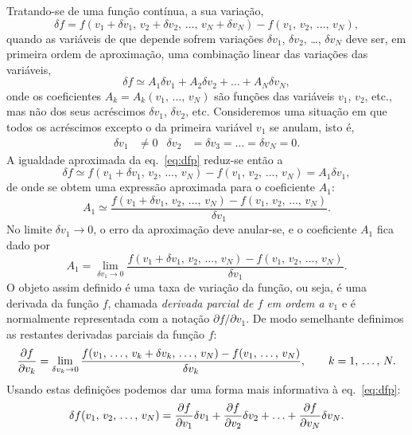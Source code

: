 Tratando-se de uma função contínua, a sua variação, 
\begin{equation*}
\delta f=f(v_1+\delta v_1,\,v_2+\delta v_2,\,\ldots,\,v_N+\delta v_N)-
f(v_1,\,v_2,\,\ldots,\,v_N),
\end{equation*}
quando as variáveis de que depende sofrem variações $\delta v_1$, $\delta v_2$,
\ldots, $\delta v_N$ deve ser, em primeira ordem de aproximação, uma combinação
linear das variações das variáveis,
\begin{equation}\label{eq:dfp}
\delta f\simeq A_1\delta v_1+A_2\delta v_2+\ldots+A_N\delta v_N,
\end{equation}
onde os coeficientes $A_k=A_k(v_1,\,\ldots,\,v_N)$ são funções das variáveis
$v_1$, $v_2$, etc., mas não dos seus acréscimos $\delta v_1$, $\delta v_2$, etc.
Consideremos uma situação em que todos os acréscimos excepto o da primeira
variável $v_1$ se anulam, isto é,
\begin{align*}
\delta v_1&\neq0&\delta v_2&=\delta v_3=\ldots=\delta v_N=0.
\end{align*}
A igualdade aproximada da eq.~\eqref{eq:dfp} reduz-se então a 
\begin{equation*}
\delta f\simeq f(v_1+\delta v_1,\,v_2,\,\ldots,\,v_N)-
    f(v_1,\,v_2,\,\ldots,\,v_N)= A_1\delta v_1,
\end{equation*}
de onde se obtem uma expressão aproximada para o coeficiente $A_1$:
\begin{equation*}
A_1\simeq
    \frac{f(v_1+\delta v_1,\,v_2,\,\ldots,\,v_N)
              -f(v_1,\,v_2,\,\ldots,\,v_N)}{\delta v_1}.
\end{equation*}
No limite $\delta v_1\rightarrow0$, o erro da aproximação deve anular-se, e o
coeficiente $A_1$ fica dado por
\begin{equation*}
A_1=\lim_{\delta v_1\rightarrow0}
    \frac{f(v_1+\delta v_1,\,v_2,\,\ldots,\,v_N)
              -f(v_1,\,v_2,\,\ldots,\,v_N)}{\delta v_1}.
\end{equation*}
O objeto assim definido é uma taxa de variação da função, ou seja, é uma
derivada da função $f$, chamada \emph{derivada parcial de $f$ em ordem a $v_1$}
e é normalmente representada com a notação $\partial f/\partial v_1$. De modo
semelhante definimos as restantes derivadas parciais da função $f$:
\begin{equation}
    \frac{\partial f}{\partial v_k} = \lim_{\delta v_k\rightarrow0}
    \frac{f(v_1,\,\ldots,\,v_k+\delta v_k,\,\ldots,\,v_N)-
        f(v_1,\,\ldots,\,v_N)}{\delta v_k},\qquad k=1,\,\ldots,\,N.
\end{equation}
Usando estas definições podemos dar uma forma mais informativa à
eq.~\eqref{eq:dfp}:
\begin{equation}\label{df}
\delta f(v_1,\,v_2,\,\ldots,\,v_N)=\frac{\partial f}{\partial v_1}\delta v_1+\frac{\partial f}{\partial v_2}\delta v_2
    +\ldots+ \frac{\partial f}{\partial v_N}\delta v_N.
\end{equation}


